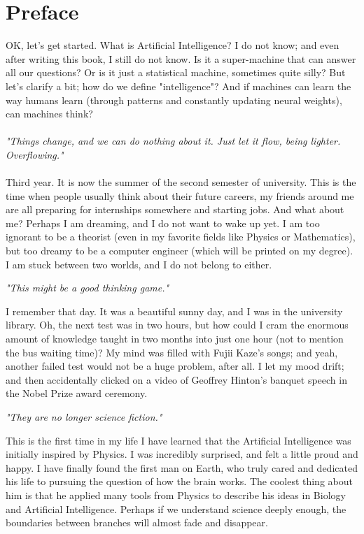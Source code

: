 \documentclass[phyai.tex]{subfiles}
\begin{document}
\chapter*{Preface}\label{chap:motivation} %
\indent OK, let's get started. What is Artificial Intelligence? I do not know; and even after writing this book, I still do not know. Is it a super-machine that can answer all our questions? Or is it just a statistical machine, sometimes quite silly? But let's clarify a bit; how do we define "intelligence"? And if machines can learn the way humans learn (through patterns and constantly updating neural weights), can machines think?
\\ \\
\textit{"Things change, and we can do nothing about it. Just let it flow, being lighter. Overflowing."}
\\ \\
\indent Third year. It is now the summer of the second semester of university. This is the time when people usually think about their future careers, my friends around me are all preparing for internships somewhere and starting jobs. And what about me? Perhaps I am dreaming, and I do not want to wake up yet. I am too ignorant to be a theorist (even in my favorite fields like Physics or Mathematics), but too dreamy to be a computer engineer (which will be printed on my degree). I am stuck between two worlds, and I do not belong to either.
\begin{center}
	\textit{"This might be a good thinking game."}
\end{center}
I remember that day. It was a beautiful sunny day, and I was in the university library. Oh, the next test was in two hours, but how could I cram the enormous amount of knowledge taught in two months into just one hour (not to mention the bus waiting time)? My mind was filled with Fujii Kaze's songs; and yeah, another failed test would not be a huge problem, after all. I let my mood drift; and then accidentally clicked on a video of Geoffrey Hinton's banquet speech in the Nobel Prize award ceremony.
\begin{center}
	\textit{"They are no longer science fiction."}
\end{center}
This is the first time in my life I have learned that the Artificial Intelligence was initially inspired by Physics. I was incredibly surprised, and felt a little proud and happy. I have finally found the first man on Earth, who truly cared and dedicated his life to pursuing the question of how the brain works. The coolest thing about him is that he applied many tools from Physics to describe his ideas in Biology and Artificial Intelligence. Perhaps if we understand science deeply enough, the boundaries between branches will almost fade and disappear.
\end{document}
